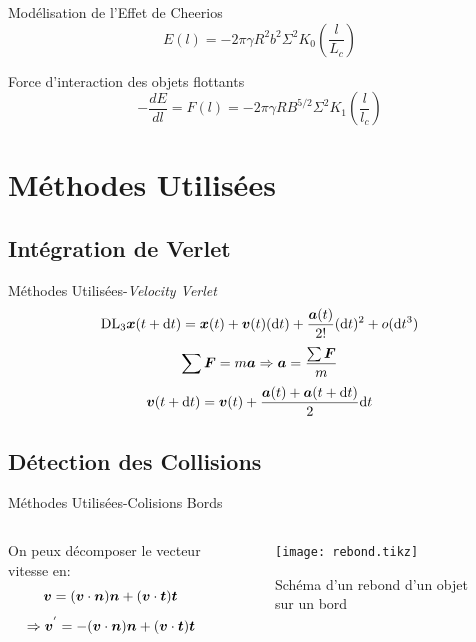 \documentclass[aspectratio=169,xcolor=dvipsnames]{beamer}
\begin{document}
\begin{frame}{Modélisation de l'Effet de Cheerios\cite{vella_cheerios_2005}}
    \[E(l)=-2\pi\gamma R^2b^2\Sigma^2K_0\left(\frac{l}{L_c}\right)\]
    \begin{block}{Force d'interaction des objets flottants}
        \[-\frac{dE}{dl} = F(l)=-2\pi\gamma RB^{5/2}\Sigma^2K_1\left(\frac{l}{l_c}\right)\]
    \end{block}

\end{frame}

\section{Méthodes Utilisées}
\subsection{Intégration de Verlet}
\begin{frame}{Méthodes Utilisées-\textit{Velocity Verlet}\cite{crivelli_stormer-verlet_2008}}
    \[\mathrm{DL}_3 \vb*{x}(t+\dd t)= \vb*{x}(t)+\vb*{v}(t)(\dd t)+\frac{\vb*{a}(t)}{2!}(\dd t)^2+o(\dd t^3)\]
    \[\sum  \vb*{F} = m\vb*{a} \Rightarrow \vb*{a} = \frac{\sum \vb*{F}}{m}\]
    \[\vb*{v}(t+\dd t) = \vb*{v}(t)+\frac{\vb*{a}(t)+\vb*{a}(t+\dd t)}{2}\dd t \]
\end{frame}

\subsection{Détection des Collisions}
\begin{frame}{Méthodes Utilisées-Colisions Bords}
    \begin{columns}
        \begin{column}[]{0.5\textwidth}
            On peux décomposer le vecteur vitesse en:
            \[\vb*{v} = (\vb*{v}\cdot\vb*{n})\vb*{n} +(\vb*{v}\cdot\vb*{t})\vb*{t}\]
            \[\Rightarrow\vb*{v}^{'} = -(\vb*{v}\cdot\vb*{n})\vb*{n} + (\vb*{v}\cdot\vb*{t})\vb*{t}\]
        \end{column}
        \begin{column}[]{0.5\textwidth}
            \begin{figure}
                \centering
                \texttt{[image: rebond.tikz]}
                \caption{Schéma d'un rebond d'un objet sur un bord}
            \end{figure}
        \end{column}
    \end{columns}
\end{frame}
\end{document}
